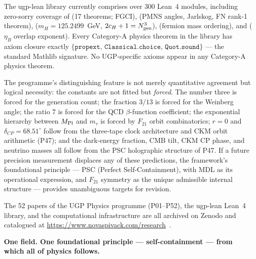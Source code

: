 The ugp-lean library currently comprises over 300 Lean~4 modules, including zero-sorry coverage of
 (17 theorems; FGCI), 
(PMNS angles, Jarlskog, FN rank-1 theorem), 
($m_H = 125.2499$~GeV, $2c_H+1=N_{\rm gen}^3$),
 (fermion mass ordering),
and  ($\eta_B$ overlap exponent).
Every Category-A physics theorem in the library has axiom closure exactly
$\{\texttt{propext},\, \texttt{Classical.choice},\, \texttt{Quot.sound}\}$ ---
the standard Mathlib signature.  No UGP-specific axioms appear in any
Category-A physics theorem.

The programme's distinguishing feature is not merely quantitative agreement but
logical necessity: the constants are not fitted but \emph{forced}.  The number three
is forced for the generation count; the fraction $3/13$ is forced for the Weinberg
angle; the ratio $7$ is forced for the QCD $\beta$-function coefficient; the
exponential hierarchy between $M_{\rm Pl}$ and $m_\tau$ is forced by $F_{21}$
orbit combinatorics; $r = 0$ and $\delta_{CP} = 68.51^\circ$ follow from the three-tape clock architecture and CKM orbit arithmetic (P47);
and the dark-energy fraction, CMB tilt, CKM CP phase, and neutrino masses all follow
from the PSC holographic structure of P47.
If a future precision measurement displaces any of these
predictions, the framework's foundational principle --- PSC (Perfect Self-Containment), with MDL
as its operational expression, and $F_{21}$ symmetry as the unique admissible
internal structure --- provides unambiguous targets for revision.

The 52 papers of the UGP Physics programme (P01--P52), the ugp-lean Lean~4 library, and the
computational infrastructure are all archived on Zenodo and catalogued at
\url{https://www.novaspivack.com/research}~\cite{SpivackResearchProgrammes}.

\medskip
\noindent\textbf{One field.  One foundational principle --- self-containment --- from
which all of physics follows.}

